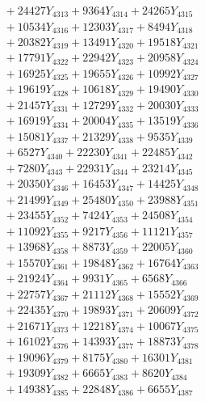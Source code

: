 \documentclass[a4paper,10pt]{article}
\begin{document}
{\begin{align}
&\;  + 24427 Y_{4313} + 9364 Y_{4314} + 24265 Y_{4315} \\[0.3ex]
&\;  + 10534 Y_{4316} + 12303 Y_{4317} + 8494 Y_{4318} \\[0.5ex]\allowbreak
&\;  + 20382 Y_{4319} + 13491 Y_{4320} + 19518 Y_{4321} \\[0.3ex]
&\;  + 17791 Y_{4322} + 22942 Y_{4323} + 20958 Y_{4324} \\[0.3ex]
&\;  + 16925 Y_{4325} + 19655 Y_{4326} + 10992 Y_{4327} \\[0.3ex]
&\;  + 19619 Y_{4328} + 10618 Y_{4329} + 19490 Y_{4330} \\[0.3ex]
&\;  + 21457 Y_{4331} + 12729 Y_{4332} + 20030 Y_{4333} \\[0.3ex]
&\;  + 16919 Y_{4334} + 20004 Y_{4335} + 13519 Y_{4336} \\[0.3ex]
&\;  + 15081 Y_{4337} + 21329 Y_{4338} + 9535 Y_{4339} \\[0.3ex]
&\;  + 6527 Y_{4340} + 22230 Y_{4341} + 22485 Y_{4342} \\[0.3ex]
&\;  + 7280 Y_{4343} + 22931 Y_{4344} + 23214 Y_{4345} \\[0.3ex]
&\;  + 20350 Y_{4346} + 16453 Y_{4347} + 14425 Y_{4348} \\[0.5ex]\allowbreak
&\;  + 21499 Y_{4349} + 25480 Y_{4350} + 23988 Y_{4351} \\[0.3ex]
&\;  + 23455 Y_{4352} + 7424 Y_{4353} + 24508 Y_{4354} \\[0.3ex]
&\;  + 11092 Y_{4355} + 9217 Y_{4356} + 11121 Y_{4357} \\[0.3ex]
&\;  + 13968 Y_{4358} + 8873 Y_{4359} + 22005 Y_{4360} \\[0.3ex]
&\;  + 15570 Y_{4361} + 19848 Y_{4362} + 16764 Y_{4363} \\[0.3ex]
&\;  + 21924 Y_{4364} + 9931 Y_{4365} + 6568 Y_{4366} \\[0.3ex]
&\;  + 22757 Y_{4367} + 21112 Y_{4368} + 15552 Y_{4369} \\[0.3ex]
&\;  + 22435 Y_{4370} + 19893 Y_{4371} + 20609 Y_{4372} \\[0.3ex]
&\;  + 21671 Y_{4373} + 12218 Y_{4374} + 10067 Y_{4375} \\[0.3ex]
&\;  + 16102 Y_{4376} + 14393 Y_{4377} + 18873 Y_{4378} \\[0.5ex]\allowbreak
&\;  + 19096 Y_{4379} + 8175 Y_{4380} + 16301 Y_{4381} \\[0.3ex]
&\;  + 19309 Y_{4382} + 6665 Y_{4383} + 8620 Y_{4384} \\[0.3ex]
&\;  + 14938 Y_{4385} + 22848 Y_{4386} + 6655 Y_{4387} \\[0.3ex]

\end{align}}
\end{document}
